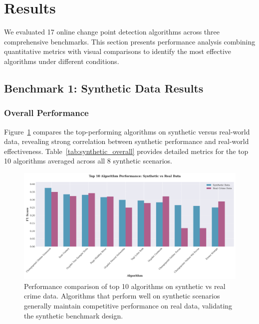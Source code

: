 \section{Results}
\label{sec:results}

We evaluated 17 online change point detection algorithms across three comprehensive benchmarks. This section presents performance analysis combining quantitative metrics with visual comparisons to identify the most effective algorithms under different conditions.

\subsection{Benchmark 1: Synthetic Data Results}
\label{sec:results_synthetic}

\subsubsection{Overall Performance}

Figure~\ref{fig:top_algorithms} compares the top-performing algorithms on synthetic versus real-world data, revealing strong correlation between synthetic performance and real-world effectiveness. Table~\ref{tab:synthetic_overall} provides detailed metrics for the top 10 algorithms averaged across all 8 synthetic scenarios.

\begin{figure}[htbp]
\centering
\includegraphics[width=\textwidth]{figures/fig_top_algorithms_comparison.png}
\caption{Performance comparison of top 10 algorithms on synthetic vs real crime data. Algorithms that perform well on synthetic scenarios generally maintain competitive performance on real data, validating the synthetic benchmark design.}
\label{fig:top_algorithms}
\end{figure}

